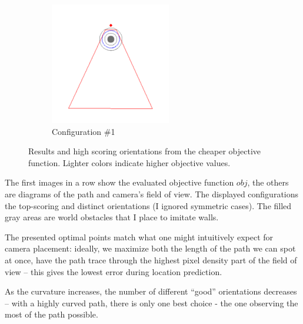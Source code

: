 \documentclass[a4paper,12pt,twoside,openright]{report}
\begin{document}
\begin{figure}[h!]
\begin{subfigure}[b]{0.25\textwidth}
    \includegraphics[width=\textwidth]{figures/simple_objective/radius_5m_pos1_small.png}
    \caption{Configuration \#1}
\end{subfigure}
\caption[Cheaper Objective Function Results]{Results and high scoring orientations from the cheaper objective function. Lighter colors indicate higher objective values.}
\label{fig:simpleobjective}
\end{figure}

The first images in a row show the evaluated objective function $obj$, the others
are diagrams of the path and camera's field of view. The displayed
configurations the top-scoring and distinct orientations (I ignored
symmetric cases). The filled gray areas are world obstacles
that I place to imitate walls.

The presented optimal points match what one might intuitively expect 
for camera placement: ideally, we maximize both the length of the path
we can spot at once, have the path trace through the highest
pixel density part of the field of view -- this gives the lowest
error during location prediction.

As the curvature increases, the number of different ``good'' 
orientations decreases -- with a highly curved path, there is only
one best choice - the one observing the most of the path possible.
\end{document}
